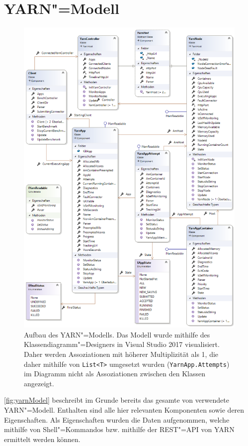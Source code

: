 \section{YARN"=Modell}\label{sec:yarnModel}

\begin{figure}
    \includegraphics[width=\columnwidth]{./images/yarnModel.png}
    \caption[Aufbau des YARN"=Modells]
    {Aufbau des YARN"=Modells.
        Das Modell wurde mithilfe des Klassendiagramm"=Designers in Visual Studio 2017 visualisiert.
        Daher werden Assoziationen mit höherer Multiplizität als 1, die daher mithilfe von \texttt{List<T>} umgesetzt wurden (\zB \texttt{YarnApp.Attempts}) im Diagramm nicht als Assoziationen zwischen den Klassen angezeigt.}
    \label{fig:yarnModel}
\end{figure}

\autoref{fig:yarnModel} beschreibt im Grunde bereits das gesamte von \sS verwendete YARN"=Modell.
Enthalten sind alle hier relevanten Komponenten sowie deren Eigenschaften.
Als Eigenschaften wurden die Daten aufgenommen, welche mithilfe von Shell"=Kommandos bzw. mithilfe der REST"=API von YARN ermittelt werden können.

